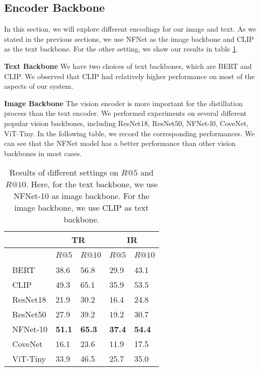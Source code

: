 \documentclass[sigconf, nonacm]{acmart}
\begin{document}
\subsection{Encoder Backbone}
In this section, we will explore different encodings for our image and text. As we stated in the previous sections, we use NFNet as the image backbone and CLIP as the text backbone. For the other setting, we show our results in table \ref{tab_backbone}.

\textbf{Text Backbone} We have two choices of text backbones, which are BERT and CLIP. We observed that CLIP had relatively higher performance on most of the aspects of our system. 

\textbf{Image Backbone} The vision encoder is more important for the distillation process than the text encoder. We performed experiments on several different popular vision backbones, including ResNet18\cite{he2016deep}, ResNet50\cite{he2016deep}, NFNet-l0\cite{brock2021high}, CoveNet, ViT-Tiny\cite{dosovitskiy2020image}. In the following table, we record the corresponding performances. We can see that the NFNet model has a better performance than other vision backbones in most cases.

\begin{table}[!h]
    \centering
    \caption{Results of different settings on \( R@5 \) and \( R@10 \). Here, for the text backbone, we use NFNet-10 as image 
 backbone. For the image backbone, we use CLIP as text backbone.}
    \label{tab_backbone}
    \begin{tabular}{l|l|l|l|l}
    \toprule
        ~ & \multicolumn{2}{c|}{TR} & \multicolumn{2}{c}{IR}  \\ \midrule
        ~ & \( R@5 \) & \( R@10 \) & \( R@5 \) & \( R@10 \)  \\ \midrule
        \ BERT & 38.6 & 56.8 & 29.9 & 43.1  \\ 
        \ CLIP & 49.3 & 65.1 & 35.9 & 53.5  \\ 
        \ ResNet18 & 21.9 & 30.2 & 16.4 & 24.8  \\ 
        \ ResNet50 & 27.9 & 39.2 & 19.2 & 30.7  \\
        \ NFNet-10 & \textbf{51.1} & \textbf{65.3} & \textbf{37.4} & \textbf{54.4}  \\ 
        \ CoveNet & 16.1 & 23.6 & 11.9 & 17.5  \\
        \ ViT-Tiny & 33.9 & 46.5 & 25.7 & 35.0  \\ \midrule
    \end{tabular}
\end{table}
\end{document}

